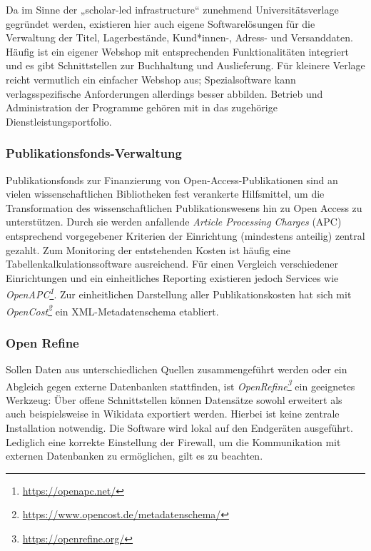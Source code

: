 \documentclass[
  11pt,
  letterpaper,
  DIV=11,
  twoside]{scrreprt}
\DeclareRobustCommand{\href}[2]{#2\footnote{\url{#1}}}
\begin{document}
Da im Sinne der „scholar-led infrastructure`` zunehmend
Universitätsverlage gegründet werden, existieren hier auch eigene
Softwarelösungen für die Verwaltung der Titel, Lagerbestände,
Kund*innen-, Adress- und Versanddaten. Häufig ist ein eigener Webshop
mit entsprechenden Funktionalitäten integriert und es gibt
Schnittstellen zur Buchhaltung und Auslieferung. Für kleinere Verlage
reicht vermutlich ein einfacher Webshop aus; Spezialsoftware kann
verlagsspezifische Anforderungen allerdings besser abbilden. Betrieb und
Administration der Programme gehören mit in das zugehörige
Dienstleistungsportfolio.

\subsubsection{Publikationsfonds-Verwaltung}\label{publikationsfonds-verwaltung}

Publikationsfonds zur Finanzierung von Open-Access-Publikationen sind an
vielen wissenschaftlichen Bibliotheken fest verankerte Hilfsmittel, um
die Transformation des wissenschaftlichen Publikationswesens hin zu Open
Access zu unterstützen. Durch sie werden anfallende \emph{Article
Processing Charges} ({APC}) entsprechend vorgegebener Kriterien der
Einrichtung (mindestens anteilig) zentral gezahlt. Zum Monitoring der
entstehenden Kosten ist häufig eine Tabellenkalkulationssoftware
ausreichend. Für einen Vergleich verschiedener Einrichtungen und ein
einheitliches Reporting existieren jedoch Services wie
\emph{\href{https://openapc.net/}{OpenAPC}}. Zur einheitlichen
Darstellung aller Publikationskosten hat sich mit
\emph{\href{https://www.opencost.de/metadatenschema/}{OpenCost}} ein
XML-Metadatenschema etabliert.

\subsubsection{Open Refine}\label{open-refine}

Sollen Daten aus unterschiedlichen Quellen zusammengeführt werden oder
ein Abgleich gegen externe Datenbanken stattfinden, ist
\emph{\href{https://openrefine.org/}{OpenRefine}} ein geeignetes
Werkzeug: Über offene Schnittstellen können Datensätze sowohl erweitert
als auch beispielsweise in Wikidata exportiert werden. Hierbei ist keine
zentrale Installation notwendig. Die Software wird lokal auf den
Endgeräten ausgeführt. Lediglich eine korrekte Einstellung der Firewall,
um die Kommunikation mit externen Datenbanken zu ermöglichen, gilt es zu
beachten.
\end{document}
